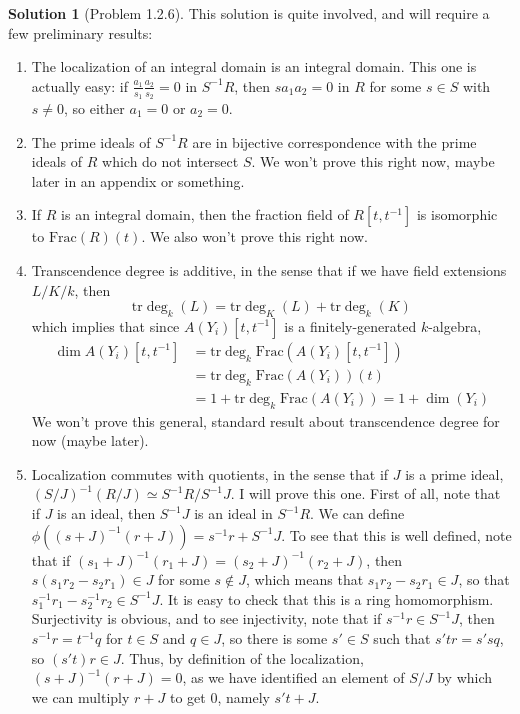\documentclass[aps,pra,showpacs,notitlepage,onecolumn,superscriptaddress,nofootinbib]{revtex4-1}
\theoremstyle{definition}
\newtheorem{solution}{Solution}[section]
\begin{document}
\begin{solution}[Problem 1.2.6]
This solution is quite involved, and will require a few preliminary results:
\begin{enumerate}
  \item The localization of an integral domain is an integral domain. This one is actually easy: if $\frac{a_1}{s_1} \frac{a_2}{s_2} = 0$ in $S^{-1} R$, then
    $s a_1 a_2 = 0$ in $R$ for some $s \in S$ with $s \neq 0$, so either $a_1 = 0$ or $a_2 = 0$.
    \item The prime ideals of $S^{-1} R$ are in bijective correspondence with the prime ideals of $R$ which do not intersect $S$. We won't prove this right now, maybe later in an appendix or something.
    \item If $R$ is an integral domain, then the fraction field of $R[t, t^{-1}]$ is isomorphic to $\text{Frac}(R)(t)$. We also won't prove this right now.
    \item Transcendence degree is additive, in the sense that if we have field extensions $L/K/k$, then
      \begin{equation}
        \text{tr} \deg_k(L) = \text{tr} \deg_K(L) + \text{tr} \deg_k(K)
        \end{equation}
      which implies that since $A(Y_i)[t, t^{-1}]$ is a finitely-generated $k$-algebra,
      \begin{align}
        \dim A(Y_i)[t, t^{-1}] &= \text{tr} \deg_k \text{Frac}(A(Y_i)[t, t^{-1}])
        \\ &= \text{tr} \deg_k \text{Frac}(A(Y_i))(t)
        \\ &= 1 + \text{tr} \deg_k \text{Frac}(A(Y_i)) = 1 + \dim(Y_i)
        \end{align}
      We won't prove this general, standard result about transcendence degree for now (maybe later).
      \item Localization commutes with quotients, in the sense that if $J$ is a prime ideal, $(S/J)^{-1}(R/J) \simeq S^{-1} R/S^{-1} J$. I will prove this one. First of all, note that if $J$
        is an ideal, then $S^{-1} J$ is an ideal in $S^{-1} R$. We can define $\phi((s + J)^{-1} (r + J)) = s^{-1} r + S^{-1} J$. To see that this is well defined, note that if $(s_1 + J)^{-1} (r_1 + J) = (s_2 + J)^{-1} (r_2 + J)$,
        then $s (s_1 r_2 - s_2 r_1) \in J$ for some $s \notin J$, which means that $s_1 r_2 - s_2 r_1 \in J$, so that $s_1^{-1} r_1 - s_2^{-1} r_2 \in S^{-1} J$. It is easy to check that this is a ring homomorphism.
        Surjectivity is obvious, and to see injectivity, note
        that if $s^{-1} r \in S^{-1} J$, then $s^{-1} r = t^{-1} q$ for $t \in S$ and $q \in J$, so there is some $s' \in S$ such that $s' t r = s' s q$, so $(s' t) r \in J$. Thus, by definition of the localization, $(s + J)^{-1} (r + J) = 0$,
        as we have identified an element of $S/J$ by which we can multiply $r + J$ to get $0$, namely $s' t + J$.


\end{enumerate}
\end{solution}
\end{document}
